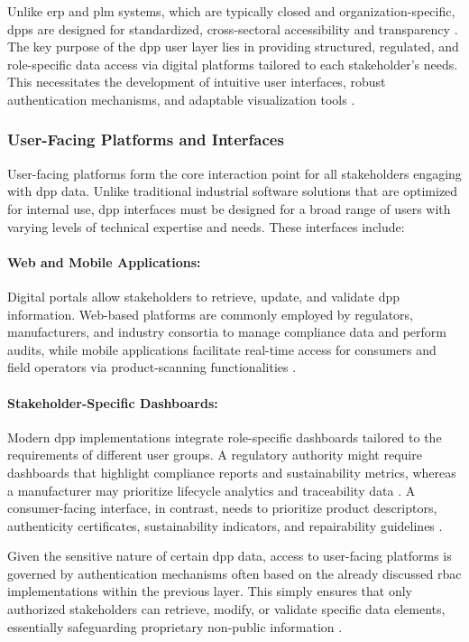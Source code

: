 Unlike \ac{erp} and \ac{plm} systems, which are typically closed and organization-specific, \ac{dpp}s are designed for standardized, cross-sectoral accessibility and transparency \autocite{Pourjafarian.2023}. The key purpose of the \ac{dpp} user layer lies in providing structured, regulated, and role-specific data access via digital platforms tailored to each stakeholder's needs. This necessitates the development of intuitive user interfaces, robust authentication mechanisms, and adaptable visualization tools \autocite{Plociennik.2022}. 

\subsubsection*{User-Facing Platforms and Interfaces}
User-facing platforms form the core interaction point for all stakeholders engaging with \ac{dpp} data. Unlike traditional industrial software solutions that are optimized for internal use, \ac{dpp} interfaces must be designed for a broad range of users with varying levels of technical expertise and needs. These interfaces include:

\paragraph{Web and Mobile Applications:}
Digital portals allow stakeholders to retrieve, update, and validate \ac{dpp} information. Web-based platforms are commonly employed by regulators, manufacturers, and industry consortia to manage compliance data and perform audits, while mobile applications facilitate real-time access for consumers and field operators via product-scanning functionalities \autocite{ZervasE..2024}. 

\paragraph{Stakeholder-Specific Dashboards:}
Modern \ac{dpp} implementations integrate role-specific dashboards tailored to the requirements of different user groups. A regulatory authority might require dashboards that highlight compliance reports and sustainability metrics, whereas a manufacturer may prioritize lifecycle analytics and traceability data \autocite{Pourjafarian.2023}. A consumer-facing interface, in contrast, needs to prioritize product descriptors, authenticity certificates, sustainability indicators, and repairability guidelines \autocite{Adisorn.2021, Plociennik.2023}.

Given the sensitive nature of certain \ac{dpp} data, access to user-facing platforms is governed by authentication mechanisms often based on the already discussed \ac{rbac} implementations within the previous layer. This simply ensures that only authorized stakeholders can retrieve, modify, or validate specific data elements, essentially safeguarding proprietary non-public information \autocite{Plociennik.2022}.

